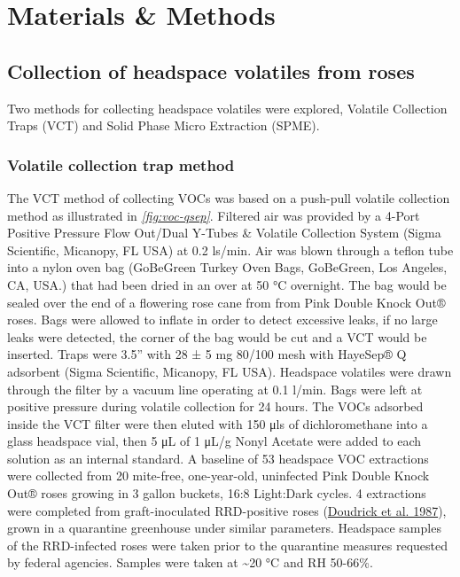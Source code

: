 \documentclass[12pt,final,CPage]{ufthesis}
\begin{document}
{  \hypertarget{mm-vocs-olfact}{%
  \section{Materials \& Methods}\label{mm-vocs-olfact}}

  \hypertarget{mm-vocs}{%
  \subsection{Collection of headspace volatiles from roses}\label{mm-vocs}}

  Two methods for collecting headspace volatiles were explored, Volatile Collection Traps (VCT) and Solid Phase Micro Extraction (SPME).

  \hypertarget{mm-vct}{%
  \subsubsection{Volatile collection trap method}\label{mm-vct}}

  The VCT method of collecting VOCs was based on a push-pull volatile collection method as illustrated in \emph{\ref{fig:voc-qsep}}. Filtered air was provided by a 4-Port Positive Pressure Flow Out/Dual Y-Tubes \& Volatile Collection System (Sigma Scientific, Micanopy, FL USA) at 0.2 \si{\litre}s/min. Air was blown through a teflon tube into a nylon oven bag (GoBeGreen Turkey Oven Bags, GoBeGreen, Los Angeles, CA, USA.) that had been dried in an over at 50 °C overnight. The bag would be sealed over the end of a flowering rose cane from from Pink Double Knock Out® roses. Bags were allowed to inflate in order to detect excessive leaks, if no large leaks were detected, the corner of the bag would be cut and a VCT would be inserted. Traps were 3.5'' with 28 ± 5 \si{\milli\gram} 80/100 mesh with HayeSep® Q adsorbent (Sigma Scientific, Micanopy, FL USA). Headspace volatiles were drawn through the filter by a vacuum line operating at 0.1 \si{\litre}/min. Bags were left at positive pressure during volatile collection for 24 hours. The VOCs adsorbed inside the VCT filter were then eluted with 150 \si{\micro\litre}s of dichloromethane into a glass headspace vial, then 5 \si{\micro\liter} of 1 \si{\micro\liter}/\si{\gram} Nonyl Acetate were added to each solution as an internal standard. A baseline of 53 headspace VOC extractions were collected from 20 mite-free, one-year-old, uninfected Pink Double Knock Out® roses growing in 3 gallon buckets, 16:8 Light:Dark cycles. 4 extractions were completed from graft-inoculated RRD-positive roses (\protect\hyperlink{ref-Doudrick1987}{Doudrick et al. 1987}), grown in a quarantine greenhouse under similar parameters. Headspace samples of the RRD-infected roses were taken prior to the quarantine measures requested by federal agencies. Samples were taken at \textasciitilde20 °C and RH 50-66\%.

}
\end{document}
